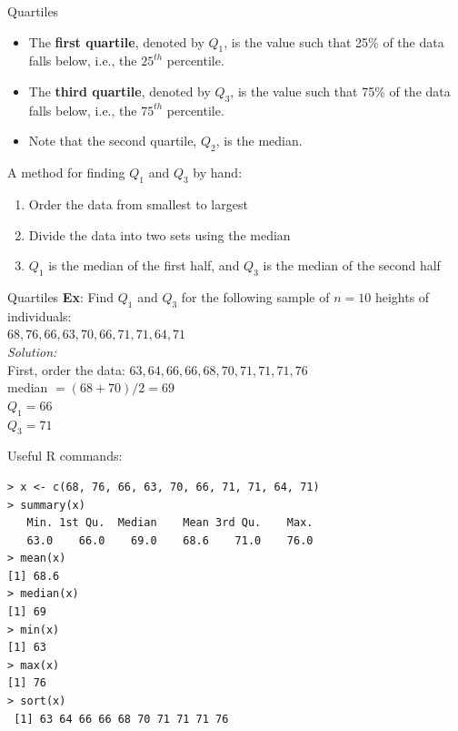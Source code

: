 \documentclass{beamer}
\begin{document}
\begin{frame}{Quartiles}

\begin{itemize}
\item The \textbf{first quartile}, denoted by $Q_1$, is the value such that 25\% of the data falls below, i.e., the $25^{th}$ percentile.
\item The \textbf{third quartile}, denoted by $Q_3$, is the value such that 75\% of the data falls below, i.e., the $75^{th}$ percentile.
\item Note that the second quartile, $Q_2$, is the median.
\end{itemize}
\vspace{10pt}

A method for finding $Q_1$ and $Q_3$ by hand:
\begin{enumerate}
\item Order the data from smallest to largest
\item Divide the data into two sets using the median
\item $Q_1$ is the median of the first half, and $Q_3$ is the median of the second half\\
\end{enumerate} 
\end{frame}

\begin{frame}{Quartiles}
\textbf{Ex}: Find $Q_1$ and $Q_3$ for the following sample of $n=10$ heights of individuals:\\ $68, 76, 66, 63, 70, 66, 71, 71, 64, 71$\\
\medskip
{\color{blue}
\emph{Solution:}\\
First, order the data: $63, 64, 66, 66, 68, 70, 71, 71, 71, 76$\\
\bigskip
median $= (68+70)/2 = 69$\\
$Q_1 = 66$\\
$Q_3 = 71$\\
}
\end{frame}

\begin{frame}[fragile]
Useful R commands:
\small
\begin{verbatim}
> x <- c(68, 76, 66, 63, 70, 66, 71, 71, 64, 71)
> summary(x) 
   Min. 1st Qu.  Median    Mean 3rd Qu.    Max. 
   63.0    66.0    69.0    68.6    71.0    76.0 
> mean(x)
[1] 68.6
> median(x)
[1] 69
> min(x)
[1] 63
> max(x)
[1] 76
> sort(x)
 [1] 63 64 66 66 68 70 71 71 71 76
\end{verbatim}
\end{frame}
\end{document}

